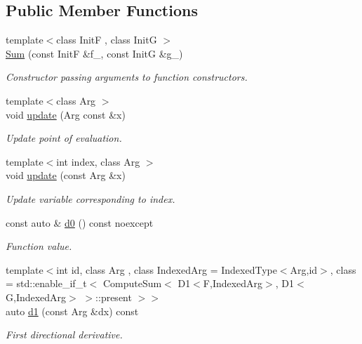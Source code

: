 \subsection*{Public Member Functions}
\begin{DoxyCompactItemize}
\item 
{\footnotesize template$<$class Init\+F , class Init\+G $>$ }\\\hyperlink{structFunG_1_1MathematicalOperations_1_1Sum_ac19577debb0ed58ab8dc809e46d5d18c}{Sum} (const Init\+F \&f\+\_\+, const Init\+G \&g\+\_\+)
\begin{DoxyCompactList}\small\item\em Constructor passing arguments to function constructors. \end{DoxyCompactList}\item 
{\footnotesize template$<$class Arg $>$ }\\void \hyperlink{structFunG_1_1MathematicalOperations_1_1Sum_abd35f8e65137de573ec0d0176c986d15}{update} (Arg const \&x)
\begin{DoxyCompactList}\small\item\em Update point of evaluation. \end{DoxyCompactList}\item 
{\footnotesize template$<$int index, class Arg $>$ }\\void \hyperlink{structFunG_1_1MathematicalOperations_1_1Sum_abbd7d6de535c953ddf3b79a2896e8068}{update} (const Arg \&x)
\begin{DoxyCompactList}\small\item\em Update variable corresponding to index. \end{DoxyCompactList}\item 
const auto \& \hyperlink{structFunG_1_1MathematicalOperations_1_1Sum_ab91123e8ebd8175db9fda72c11cd1940}{d0} () const noexcept
\begin{DoxyCompactList}\small\item\em Function value. \end{DoxyCompactList}\item 
{\footnotesize template$<$int id, class Arg , class Indexed\+Arg  = Indexed\+Type$<$\+Arg,id$>$, class  = std\+::enable\+\_\+if\+\_\+t$<$ Compute\+Sum$<$ D1$<$\+F,\+Indexed\+Arg$>$, D1$<$\+G,\+Indexed\+Arg$>$ $>$\+::present $>$$>$ }\\auto \hyperlink{structFunG_1_1MathematicalOperations_1_1Sum_a0327f21277ac4babad3a8f74ed99a3ed}{d1} (const Arg \&dx) const 
\begin{DoxyCompactList}\small\item\em First directional derivative. \end{DoxyCompactList}\item 

\end{DoxyCompactItemize}
